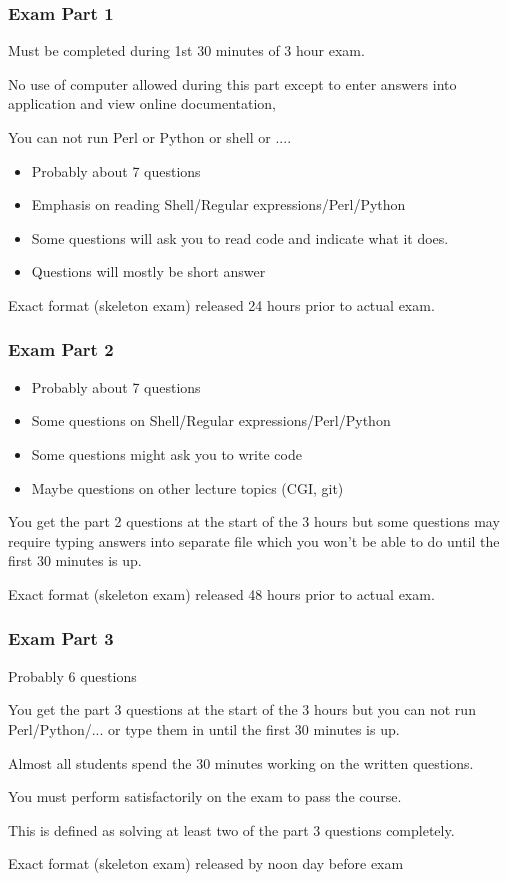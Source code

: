 \begin{frame}
\frametitle{Exam Part 1}
Must be completed during 1st 30 minutes of 3 hour exam.

No use of computer allowed during this part except to enter answers into 
application and view online documentation,

You can not run Perl or Python or shell or ....

\begin{itemize}
\item Probably about 7 questions
\item Emphasis on reading Shell/Regular expressions/Perl/Python
\item Some questions will ask you to read code and indicate what it does.
\item Questions will mostly be short answer
\end{itemize}

Exact format (skeleton exam) released 24 hours prior to actual exam.
\end{frame}

\begin{frame}
\frametitle{Exam Part 2}
\begin{itemize}
\item Probably about 7 questions
\item Some questions on Shell/Regular expressions/Perl/Python
\item Some questions might ask you to write code
\item Maybe questions on other lecture topics (CGI, git)
\end{itemize}

You  get the part 2 questions at the start of the 3 hours but
some questions may require typing answers into separate file which you won't be able to
do until the first 30 minutes is up.

Exact format (skeleton exam) released 48 hours prior to actual exam.
\end{frame}

\begin{frame}
\frametitle{Exam Part 3}
Probably 6 questions 

You get the part 3 questions at the start of the 3 hours but you
can not run Perl/Python/... or type them in until the first 30 minutes is up.

Almost all students spend the 30 minutes  working on the written questions.

You must perform satisfactorily on the exam to pass the course.

This is defined as solving at least two of the part 3 questions completely.

Exact format (skeleton exam) released by noon day before exam
\end{frame}


